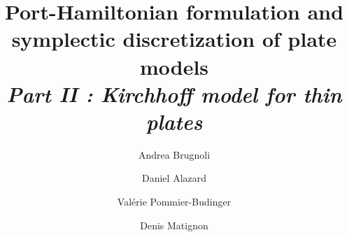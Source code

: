 \documentclass[preprint,12pt]{elsarticle}
\begin{document}
	
	\begin{frontmatter}	
		
		\title{Port-Hamiltonian formulation and \\
		symplectic discretization of plate models\\
		\vspace{2mm} \large\textit{Part II : Kirchhoff model for thin plates}}	
		\author[ISAE]{Andrea Brugnoli}
		
		\author[ISAE]{Daniel Alazard}
		
		\author[ISAE]{Valérie Pommier-Budinger}
		
		\author[ISAE]{Denis Matignon}
		
		
		
	    \address[ISAE]{ISAE-SUPAERO, Universit\'e de Toulouse, France.\\
		\vspace{2mm} {10 Avenue Edouard Belin, BP-54032, 31055 Toulouse Cedex 4.}}
		

\end{frontmatter}
\end{document}
